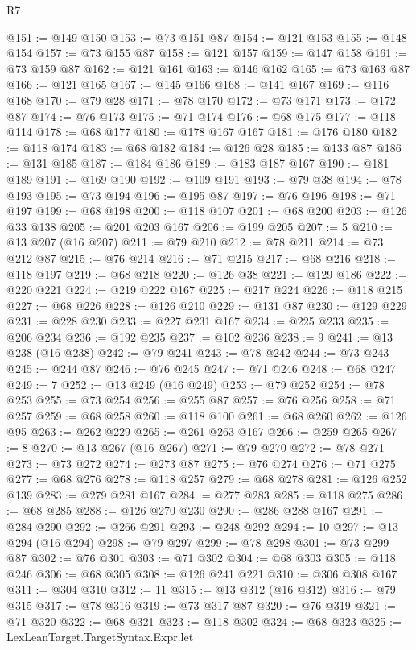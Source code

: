 \begin{lexlean}{R7}
\begin{coremodule}
@151 := @149 @150
@153 := @73 @151 @87
@154 := @121 @153
@155 := @148 @154
@157 := @73 @155 @87
@158 := @121 @157
@159 := @147 @158
@161 := @73 @159 @87
@162 := @121 @161
@163 := @146 @162
@165 := @73 @163 @87
@166 := @121 @165
@167 := @145 @166
@168 := @141 @167
@169 := @116 @168
@170 := @79 @28
@171 := @78 @170
@172 := @73 @171
@173 := @172 @87
@174 := @76 @173
@175 := @71 @174
@176 := @68 @175
@177 := @118 @114
@178 := @68 @177
@180 := @178 @167 @167
@181 := @176 @180
@182 := @118 @174
@183 := @68 @182
@184 := @126 @28
@185 := @133 @87
@186 := @131 @185
@187 := @184 @186
@189 := @183 @187 @167
@190 := @181 @189
@191 := @169 @190
@192 := @109 @191
@193 := @79 @38
@194 := @78 @193
@195 := @73 @194
@196 := @195 @87
@197 := @76 @196
@198 := @71 @197
@199 := @68 @198
@200 := @118 @107
@201 := @68 @200
@203 := @126 @33 @138
@205 := @201 @203 @167
@206 := @199 @205
@207 := 5
@210 := @13 @207 (@16 @207)
@211 := @79 @210
@212 := @78 @211
@214 := @73 @212 @87
@215 := @76 @214
@216 := @71 @215
@217 := @68 @216
@218 := @118 @197
@219 := @68 @218
@220 := @126 @38
@221 := @129 @186
@222 := @220 @221
@224 := @219 @222 @167
@225 := @217 @224
@226 := @118 @215
@227 := @68 @226
@228 := @126 @210
@229 := @131 @87
@230 := @129 @229
@231 := @228 @230
@233 := @227 @231 @167
@234 := @225 @233
@235 := @206 @234
@236 := @192 @235
@237 := @102 @236
@238 := 9
@241 := @13 @238 (@16 @238)
@242 := @79 @241
@243 := @78 @242
@244 := @73 @243
@245 := @244 @87
@246 := @76 @245
@247 := @71 @246
@248 := @68 @247
@249 := 7
@252 := @13 @249 (@16 @249)
@253 := @79 @252
@254 := @78 @253
@255 := @73 @254
@256 := @255 @87
@257 := @76 @256
@258 := @71 @257
@259 := @68 @258
@260 := @118 @100
@261 := @68 @260
@262 := @126 @95
@263 := @262 @229
@265 := @261 @263 @167
@266 := @259 @265
@267 := 8
@270 := @13 @267 (@16 @267)
@271 := @79 @270
@272 := @78 @271
@273 := @73 @272
@274 := @273 @87
@275 := @76 @274
@276 := @71 @275
@277 := @68 @276
@278 := @118 @257
@279 := @68 @278
@281 := @126 @252 @139
@283 := @279 @281 @167
@284 := @277 @283
@285 := @118 @275
@286 := @68 @285
@288 := @126 @270 @230
@290 := @286 @288 @167
@291 := @284 @290
@292 := @266 @291
@293 := @248 @292
@294 := 10
@297 := @13 @294 (@16 @294)
@298 := @79 @297
@299 := @78 @298
@301 := @73 @299 @87
@302 := @76 @301
@303 := @71 @302
@304 := @68 @303
@305 := @118 @246
@306 := @68 @305
@308 := @126 @241 @221
@310 := @306 @308 @167
@311 := @304 @310
@312 := 11
@315 := @13 @312 (@16 @312)
@316 := @79 @315
@317 := @78 @316
@319 := @73 @317 @87
@320 := @76 @319
@321 := @71 @320
@322 := @68 @321
@323 := @118 @302
@324 := @68 @323
@325 := LexLeanTarget.TargetSyntax.Expr.let

\end{coremodule}
\end{lexlean}
